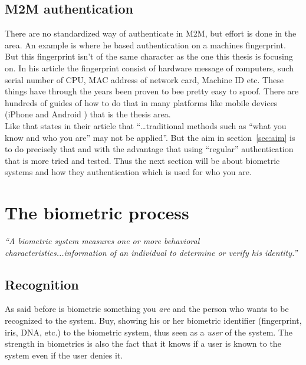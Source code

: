 \subsection{M2M authentication}
There are no standardized way of authenticate in M2M, but effort is done in the area. An example is \cite[]{auth:M2M} where he based authentication on a machines fingerprint. But this fingerprint isn't of the same character as the one this thesis is focusing on. In his article the fingerprint consist of hardware message of computers, such serial number of CPU, MAC address of network card, Machine ID etc. These things have through the years been proven to bee pretty easy to spoof. There are hundreds of guides of how to do that in many platforms like mobile devices (iPhone \cite[]{spoofMaciPhone} and Android \cite[]{spoofMacAndriod}) that is the thesis area. \\
Like \cite[]{auth:M2Mcom} that states in their article that ``\dots traditional methods such as “what you know and who you are” may not be applied''. But the aim in section~\ref{sec:aim} is to do precisely that and with the advantage that using ``regular'' authentication that is more  tried and tested. Thus the next section will be about biometric systems and how they authentication which is used for who you are.


\section{The biometric process}\label{sec:biometric}
\begin{center}\textit{``A biometric system measures one or more behavioral characteristics...information of an individual to determine or verify his identity.''} \cite[p.~3]{introbio}\end{center}

\subsection{Recognition}
As said before is biometric something you \textit{are} and the person who wants to be recognized to the system. Buy, showing his or her biometric identifier (fingerprint, iris, DNA, etc.) to the biometric system, thus seen as a \textit{user} of the system. The strength in biometrics is also the fact that it knows if a user is known to the system even if the user denies it. \cite[ch.~1]{introbio}

